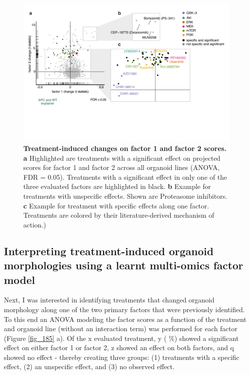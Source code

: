 \begin{flushleft}
\begin{figure}[h]
\centering
\includegraphics[scale=0.75,
                keepaspectratio]{figures/adenomaprofiling/pdf/fig_5_3_1.pdf}
\caption[Treatment-induced changes on factor 1 and factor 2 scores]{\textbf{Treatment-induced changes on factor 1 and factor 2 scores. a} Highlighted are treatments with a significant effect on projected scores for factor 1 and factor 2 across all organoid lines (ANOVA, FDR = 0.05). Treatments with a significant effect in only one of the three evaluated factors are highlighted in black. \textbf{b} Example for treatments with unspecific effects. Shown are Proteasome inhibitors. \textbf{c} Example for treatment with specific effects along one factor. Treatments are colored by their literature-derived mechanism of action.)}
\label{fig_180}
\end{figure}
\bigbreak

\subsection{Interpreting treatment-induced organoid morphologies using a learnt multi-omics factor model}

Next, I was interested in identifying treatments that changed organoid morphology along one of the two primary factors that were previously identified. To this end an ANOVA modeling the factor scores as a function of the treatment and organoid line (without an interaction term) was performed for each factor (Figure \ref{fig_185} a). Of the x evaluated treatment, y ( \%) showed a significant effect on either factor 1 or factor 2, z showed an effect on both factors, and q showed no effect - thereby creating three groups: (1) treatments with a specific effect, (2) an unspecific effect, and (3) no observed effect. 
\par


\end{flushleft}
